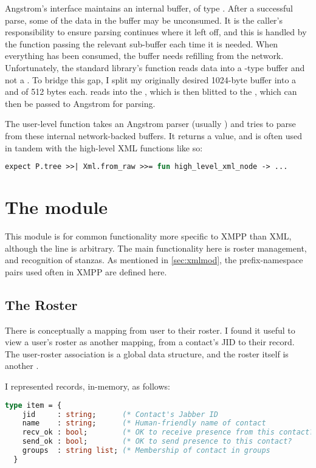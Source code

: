 \documentclass[12pt,a4paper,twoside,openright]{report}
\begin{document}
{Angstrom's  interface maintains an internal buffer, of type . After a successful parse, some of the data in the buffer may be unconsumed. It is the caller's responsibility to ensure parsing continues where it left off, and this is handled by the function passing the relevant sub-buffer each time it is needed. When everything has been consumed, the buffer needs refilling from the network. Unfortunately, the standard library's  function reads data into a -type buffer and not a . To bridge this gap, I split my originally desired 1024-byte buffer into a  and  of 512 bytes each.  reads into the , which is then blitted to the , which can then be passed to Angstrom for parsing.

The user-level  function takes an Angstrom parser (usually ) and tries to parse from these internal network-backed buffers. It returns a  value, and is often used in tandem with the high-level XML functions like so:

\begin{lstlisting}[language=ml]
expect P.tree >>| Xml.from_raw >>= fun high_level_xml_node -> ...
\end{lstlisting}

\section{The  module}
This module is for common functionality more specific to XMPP than XML, although the line is arbitrary. The main functionality here is roster management, and recognition of stanzas. As mentioned in \ref{sec:xmlmod}, the prefix-namespace pairs used often in XMPP are defined here.

\subsection{The Roster}
There is conceptually a mapping from user to their roster. I found it useful to view a user's roster as another mapping, from a contact's JID to their  record. The user-roster association is a global  data structure, and the roster itself is another .

I represented  records, in-memory, as follows:

\begin{lstlisting}[language=ml]
  type item = {
    jid     : string;      (* Contact's Jabber ID                       *)
    name    : string;      (* Human-friendly name of contact            *)
    recv_ok : bool;        (* OK to receive presence from this contact? *)
    send_ok : bool;        (* OK to send presence to this contact?      *)
    groups  : string list; (* Membership of contact in groups           *)
  }
\end{lstlisting}

}
\end{document}
